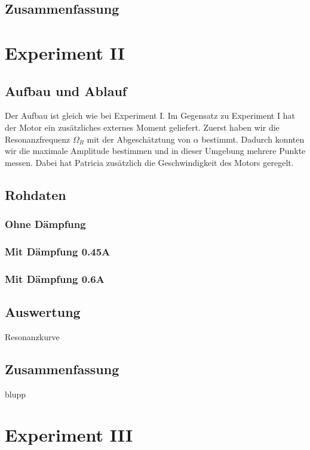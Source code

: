 \documentclass[12pt,a4paper]{article}
\begin{document}
\subsection*{Zusammenfassung}

\section*{Experiment II}

\subsection*{Aufbau und Ablauf}
Der Aufbau ist gleich wie bei Experiment I. Im Gegensatz zu Experiment I hat der Motor ein zus\"atzliches externes Moment geliefert. 
Zuerst haben wir die Resonanzfrequenz $\Omega_R$ mit der Abgesch\"atztung von $\alpha$ bestimmt. Dadurch konnten wir die maximale Amplitude bestimmen und in dieser Umgebung mehrere Punkte messen.
Dabei hat Patricia zus\"atzlich die Geschwindigkeit des Motors geregelt.

\subsection*{Rohdaten}
\subsubsection*{Ohne D\"ampfung}

\subsubsection*{Mit D\"ampfung 0.45A}

\subsubsection*{Mit D\"ampfung 0.6A}

\subsection*{Auswertung}
Resonanzkurve

\subsection*{Zusammenfassung}
blupp

\section*{Experiment III}
\end{document}
